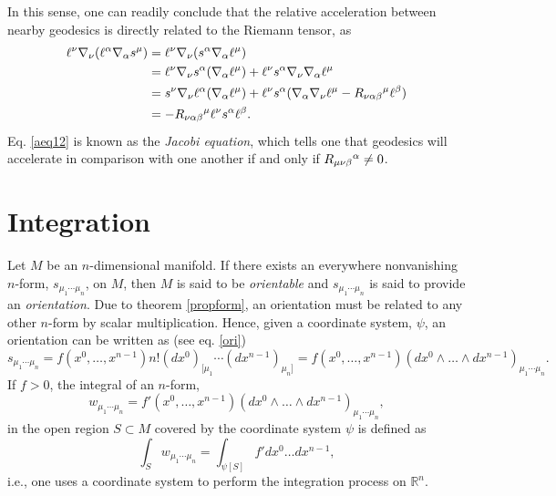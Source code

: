 \documentclass[
12pt,		%
openright,	%
twoside,  %
a4paper,			%
chapter=TITLE,		%
english,			%
french,				%
spanish,			%
brazil				%
]{USPSC-classe/USPSC}
\begin{document}
\begin{apendicesenv}
In this sense, one can readily conclude that the relative acceleration between nearby geodesics is directly related to the Riemann tensor, as
\begin{equation}\label{aeq12}
\begin{aligned}[b]
\ell^{\nu}\nabla_{\nu}(\ell^{\alpha}\nabla_{\alpha}s^{\mu}) 
        & =\ell^{\nu}\nabla_{\nu}(s^{\alpha}\nabla_{\alpha}\ell^{\mu})\\
        & =\ell^{\nu}\nabla_{\nu}s^{\alpha}(\nabla_{\alpha}\ell^{\mu})+\ell^{\nu}s^{\alpha}\nabla_{\nu}\nabla_{\alpha}\ell^{\mu}\\
        & =s^{\nu}\nabla_{\nu}\ell^{\alpha}(\nabla_{\alpha}\ell^{\mu})+\ell^{\nu}s^{\alpha}(\nabla_{\alpha}\nabla_{\nu}\ell^{\mu}-R_{\nu\alpha\beta}\mathstrut^{\mu}\ell^{\beta})\\
        & =-R_{\nu\alpha\beta}\mathstrut^{\mu}\ell^{\nu}s^{\alpha}\ell^{\beta}.
\end{aligned}
\end{equation}
Eq. \ref{aeq12} is known as the \textit{Jacobi equation}, which tells one that geodesics will accelerate in comparison with one another if and only if $R_{\mu\nu\beta}\mathstrut^{\alpha}\neq 0$.


\section{Integration}\label{integration}

Let $M$ be an $n$-dimensional manifold. If there exists an everywhere nonvanishing $n$-form, $s_{\mu_1\cdots\mu_{n}}$, on $M$, then $M$ is said to be \textit{orientable} and $s_{\mu_1\cdots\mu_{n}}$ is said to provide an \textit{orientation}. Due to theorem \ref{propform}, an orientation must be related to any other $n$-form by scalar multiplication. Hence, given a coordinate system, $\psi$, an orientation can be written as (see eq. \ref{ori})
\begin{equation}
    s_{\mu_1\cdots\mu_{n}}=f(x^0,\ldots,x^{n-1})n!(dx^0)_{[\mu_1}\cdots(dx^{n-1})_{\mu_{n}]}=f(x^0,\ldots,x^{n-1})(dx^{0}\wedge\ldots\wedge dx^{n-1})_{\mu_1\cdots\mu_{n}}.
\end{equation}
If $f>0$, the integral of an $n$-form,
\begin{equation}
    w_{\mu_1\cdots\mu_{n}}=f'(x^0,\ldots,x^{n-1})(dx^{0}\wedge\ldots\wedge dx^{n-1})_{\mu_1\cdots\mu_{n}},
\end{equation}
in the open region $S\subset M$ covered by the coordinate system $\psi$ is defined as 
\begin{equation}\label{aeq102}
    \int_{S}w_{\mu_1\cdots\mu_{n}}=\int_{\psi[S]}f'dx^0\ldots dx^{n-1},
\end{equation}
i.e., one uses a coordinate system to perform the integration process on $\mathbb{R}^n$. 


\end{apendicesenv}
\end{document}
